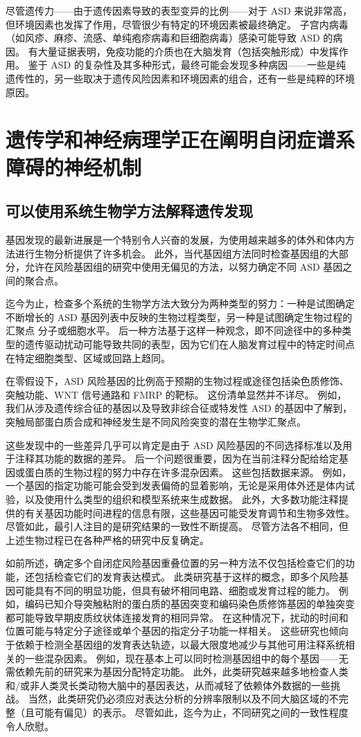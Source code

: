 尽管遗传力——由于遗传因素导致的表型变异的比例——对于 ASD 来说非常高，但环境因素也发挥了作用，尽管很少有特定的环境因素被最终确定。 子宫内病毒（如风疹、麻疹、流感、单纯疱疹病毒和巨细胞病毒）感染可能导致 ASD 的病因。 有大量证据表明，免疫功能的介质也在大脑发育（包括突触形成）中发挥作用。 鉴于 ASD 的复杂性及其多种形式，最终可能会发现多种病因——一些是纯遗传性的，另一些取决于遗传风险因素和环境因素的组合，还有一些是纯粹的环境原因。

\section{遗传学和神经病理学正在阐明自闭症谱系障碍的神经机制}
\subsection{可以使用系统生物学方法解释遗传发现}
基因发现的最新进展是一个特别令人兴奋的发展，为使用越来越多的体外和体内方法进行生物分析提供了许多机会。 此外，当代基因组方法同时检查基因组的大部分，允许在风险基因组的研究中使用无偏见的方法，以努力确定不同 ASD 基因之间的聚合点。

迄今为止，检查多个系统的生物学方法大致分为两种类型的努力：一种是试图确定不断增长的 ASD 基因列表中反映的生物过程类型，另一种是试图确定生物过程的汇聚点 分子或细胞水平。 后一种方法基于这样一种观念，即不同途径中的多种类型的遗传驱动扰动可能导致共同的表型，因为它们在人脑发育过程中的特定时间点在特定细胞类型、区域或回路上趋同。

在零假设下，ASD 风险基因的比例高于预期的生物过程或途径包括染色质修饰、突触功能、WNT 信号通路和 FMRP 的靶标。 这份清单显然并不详尽。 例如，我们从涉及遗传综合征的基因以及导致非综合征或特发性 ASD 的基因中了解到，突触局部蛋白质合成和神经发生是不同风险突变的潜在生物学汇聚点。

这些发现中的一些差异几乎可以肯定是由于 ASD 风险基因的不同选择标准以及用于注释其功能的数据的差异。 后一个问题很重要，因为在当前注释分配给给定基因或蛋白质的生物过程的努力中存在许多混杂因素。 这些包括数据来源。 例如，一个基因的指定功能可能会受到发表偏倚的显着影响，无论是采用体外还是体内试验，以及使用什么类型的组织和模型系统来生成数据。 此外，大多数功能注释提供的有关基因功能时间进程的信息有限，这些基因可能受发育调节和生物多效性。 尽管如此，最引人注目的是研究结果的一致性不断提高。 尽管方法各不相同，但上述生物过程已在各种严格的研究中反复确定。

如前所述，确定多个自闭症风险基因重叠位置的另一种方法不仅包括检查它们的功能，还包括检查它们的发育表达模式。 此类研究基于这样的概念，即多个风险基因可能具有不同的明显功能，但具有破坏相同电路、细胞或发育过程的能力。 例如，编码已知介导突触粘附的蛋白质的基因突变和编码染色质修饰基因的单独突变都可能导致早期皮质纹状体连接发育的相同异常。 在这种情况下，扰动的时间和位置可能与特定分子途径或单个基因的指定分子功能一样相关。 这些研究也倾向于依赖于检测全基因组的发育表达轨迹，以最大限度地减少与其他可用注释系统相关的一些混杂因素。 例如，现在基本上可以同时检测基因组中的每个基因——无需依赖先前的研究来为基因分配特定功能。 此外，此类研究越来越多地检查人类和/或非人类灵长类动物大脑中的基因表达，从而减轻了依赖体外数据的一些挑战。 当然，此类研究仍必须应对表达分析的分辨率限制以及不同大脑区域的不完整（且可能有偏见）的表示。 尽管如此，迄今为止，不同研究之间的一致性程度令人欣慰。

